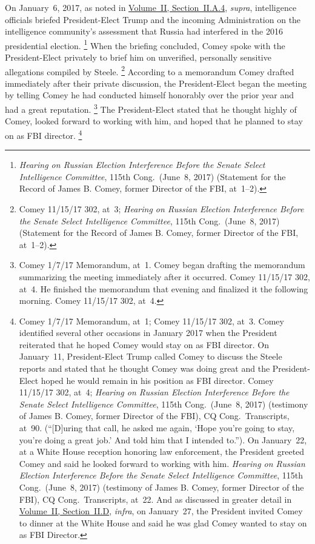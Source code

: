 On January~6, 2017, as noted in \hyperlink{subsubsection.2.2.1.4}{Volume~II, Section~II.A.4}, \textit{supra}, intelligence officials briefed President-Elect Trump and the incoming Administration on the intelligence community's assessment that Russia had interfered in the 2016 presidential election.%
\footnote{\textit{Hearing on Russian Election Interference Before the Senate Select Intelligence Committee}, 115th Cong.\ (June~8, 2017) (Statement for the Record of James B. Comey, former Director of the FBI, at~1--2).}
When the briefing concluded, Comey spoke with the President-Elect privately to brief him on unverified, personally sensitive allegations compiled by Steele.%
\footnote{Comey 11/15/17 302, at~3;
\textit{Hearing on Russian Election Interference Before the Senate Select Intelligence Committee}, 115th Cong.\ (June~8, 2017) (Statement for the Record of James B. Comey, former Director of the FBI, at~1--2).}
According to a memorandum Comey drafted immediately after their private discussion, the President-Elect began the meeting by telling Comey he had conducted himself honorably over the prior year and had a great reputation.%
\footnote{Comey 1/7/17 Memorandum, at~1.
Comey began drafting the memorandum summarizing the meeting immediately after it occurred.
Comey 11/15/17 302, at~4.
He finished the memorandum that evening and finalized it the following morning.
Comey 11/15/17 302, at~4.}
The President-Elect stated that he thought highly of Comey, looked forward to working with him, and hoped that he planned to stay on as FBI director.%
\footnote{Comey 1/7/17 Memorandum, at~1;
Comey 11/15/17 302, at~3.
Comey identified several other occasions in January 2017 when the President reiterated that he hoped Comey would stay on as FBI director.
On January~11, President-Elect Trump called Comey to discuss the Steele reports and stated that he thought Comey was doing great and the President-Elect hoped he would remain in his position as FBI director.
Comey 11/15/17 302, at~4;
\textit{Hearing on Russian Election Interference Before the Senate Select Intelligence Committee}, 115th Cong.\ (June~8, 2017) (testimony of James B. Comey, former Director of the FBI), CQ Cong.\ Transcripts, at~90.
(``[D]uring that call, he asked me again, `Hope you're going to stay, you're doing a great job.' And told him that I intended to.'').
On January~22, at a White House reception honoring law enforcement, the President greeted Comey and said he looked forward to working with him.
\textit{Hearing on Russian Election Interference Before the Senate Select Intelligence Committee}, 115th Cong.\ (June~8, 2017) (testimony of James B. Comey, former Director of the FBI), CQ Cong.\ Transcripts, at~22.
And as discussed in greater detail in \hyperlink{subsection.2.2.4}{Volume~II, Section~II.D}, \textit{infra}, on January~27, the President invited Comey to dinner at the White House and said he was glad Comey wanted to stay on as FBI Director.}
